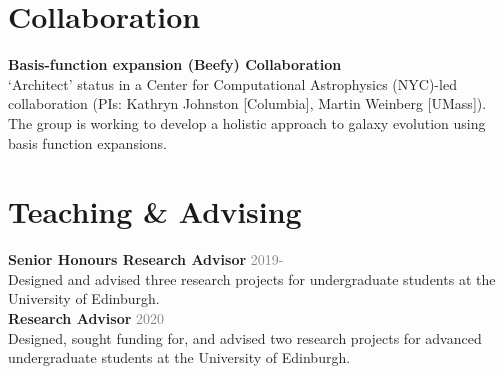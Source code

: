 \documentclass[margin, 11pt]{res} %
\begin{document}
\begin{resume}





\section{\sc \textcolor{redshade}{Collaboration}}

{\bf Basis-function expansion (Beefy) Collaboration} \\
`Architect' status in a Center for Computational Astrophysics (NYC)-led collaboration (PIs: Kathryn Johnston [Columbia], Martin Weinberg [UMass]). The group is working to develop a holistic approach to galaxy evolution using basis function expansions.\\




\section{\sc \textcolor{redshade}{Teaching \& Advising}}


{\bf Senior Honours Research Advisor} \hfill\textcolor{grey}{2019-}\\
Designed and advised three research projects for undergraduate students at the University of Edinburgh.\\

{\bf Research Advisor} \hfill\textcolor{grey}{2020}\\
Designed, sought funding for, and advised two research projects for advanced undergraduate students at the University of Edinburgh.


\end{resume}
\end{document}
